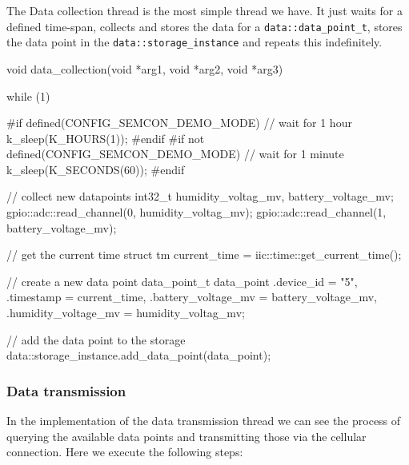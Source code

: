 The Data collection thread is the most simple thread we have. It just waits for a defined time-span, collects and stores the data for a \verb|data::data_point_t|, stores the data point in the \verb|data::storage_instance| and repeats this indefinitely.

\begin{cpp}[caption={Implementation of the data collection thread}]
void data_collection(void *arg1, void *arg2, void *arg3)
{
    while (1)
    {

        #if defined(CONFIG_SEMCON_DEMO_MODE)
        // wait for 1 hour 
        k_sleep(K_HOURS(1));
        #endif
        #if not defined(CONFIG_SEMCON_DEMO_MODE)
        // wait for 1 minute
        k_sleep(K_SECONDS(60));
        #endif

        // collect new datapoints
        int32_t humidity_voltag_mv, battery_voltage_mv;
        gpio::adc::read_channel(0, humidity_voltag_mv);
        gpio::adc::read_channel(1, battery_voltage_mv);


        // get the current time
        struct tm current_time = iic::time::get_current_time();

        // create a new data point
        data_point_t data_point{
            .device_id = "5",
            .timestamp = current_time,
            .battery_voltage_mv = battery_voltage_mv,
            .humidity_voltage_mv = humidity_voltag_mv};
        
        // add the data point to the storage
        data::storage_instance.add_data_point(data_point);
    }
}
\end{cpp}

\subsubsection{Data transmission}

In the implementation of the data transmission thread we can see the process of querying the available data points and transmitting those via the cellular connection. Here we execute the following steps:

